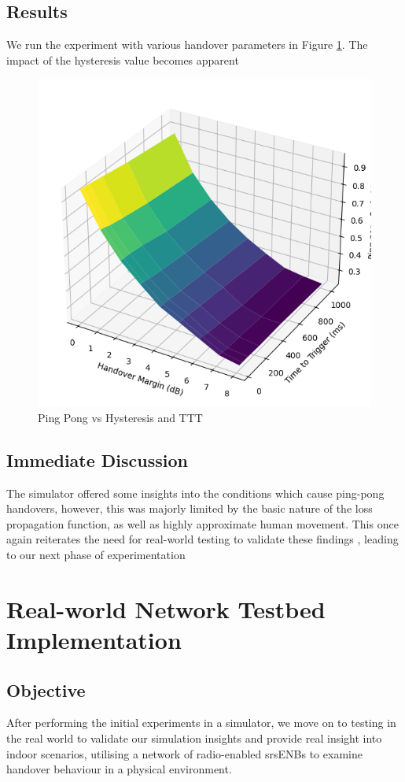 \subsection{Results}
We run the experiment with various handover parameters in Figure \ref{fig:methods:pingpong-uesim}. The impact of the hysteresis value becomes apparent 
\begin{figure}
    \centering
    \includegraphics[width=0.5\linewidth]{src//img/pingpong_uesim.png}
    \caption{Ping Pong vs Hysteresis and TTT}
    \label{fig:methods:pingpong-uesim}
\end{figure}
\subsection{Immediate Discussion}
The simulator offered some insights into the conditions which cause ping-pong handovers, however, this was majorly limited by the basic nature of the loss propagation function, as well as highly approximate human movement. This once again reiterates the need for real-world testing to validate these findings , leading to our next phase of experimentation

\section{Real-world Network Testbed Implementation}
\subsection{Objective}
After performing the initial experiments in a simulator, we move on to testing in the real world to validate our simulation insights and provide real insight into indoor scenarios, utilising a network of radio-enabled srsENBs to examine handover behaviour in a physical environment.
